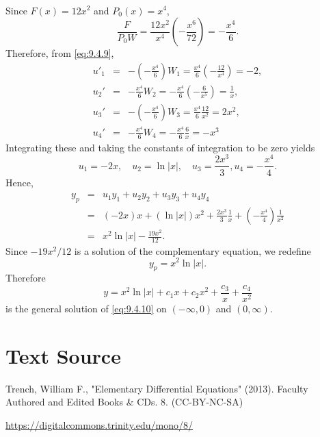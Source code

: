 \documentclass{ximera}
\begin{document}
\begin{example}
\begin{explanation}
\begin{eqnarray*}
\end{eqnarray*}
 Since $F(x)=12x^2$ and $P_0(x)=x^4$,
$$
\frac{F}{P_0W}=\frac{12x^2}{x^4}\left(-\frac{x^6}{72}\right)=-\frac{x^4}{6}.
$$
Therefore, from \eqref{eq:9.4.9},
\begin{eqnarray*}
u'_1&=&-\left(-\frac{x^4}{6}\right)W_1=\frac{x^4}{6}\left(-\frac{12}{x^4}\right)=-2,\\
 u_2'&=&-\frac{x^4}{6}W_2=-\frac{x^4}{6}\left(-\frac{6}{x^5}\right)
=\frac{1}{x},\\
u_3'&=&-\left(-\frac{x^4}{6}\right)W_3=\frac{x^4}{6}\frac{12}{x^2}=2x^2,\\
  u_4'&=&-\frac{x^4}{6}W_4=-\frac{x^4}{6}\frac{6}{x}=-x^3
\end{eqnarray*}
 Integrating these and taking the constants of
integration to be zero yields
$$
u_1=-2x,\quad u_2=\ln|x|,\quad u_3=\frac{2x^3}{3},
u_4=-\frac{x^4}{4}.
$$
Hence,
\begin{eqnarray*}
y_p&=&u_1y_1+u_2y_2+u_3y_3+u_4y_4\\
&=&(-2x)x+(\ln|x|)x^2+\frac{2x^3}{3}\frac{1}{x}+\left(-\frac{x^4}{4}\right)
\frac{1}{x^2} \\&=&x^2\ln|x|-\frac{19x^2}{12}.
\end{eqnarray*}
Since $-19x^2/12$ is a solution of the complementary equation, we redefine
$$
y_p=x^2\ln|x|.
$$
 Therefore
$$
y=x^2\ln|x|+c_1x+c_2x^2+\frac{c_3}{x}+\frac{c_4}{x^2}
$$
is the general solution of \eqref{eq:9.4.10} on $(-\infty,0)$ and $(0,\infty)$.
\end{explanation}
\end{example}




\section*{Text Source}
Trench, William F., "Elementary Differential Equations" (2013). Faculty Authored and Edited Books \& CDs. 8. (CC-BY-NC-SA)

\href{https://digitalcommons.trinity.edu/mono/8/}{https://digitalcommons.trinity.edu/mono/8/}
\end{document}
